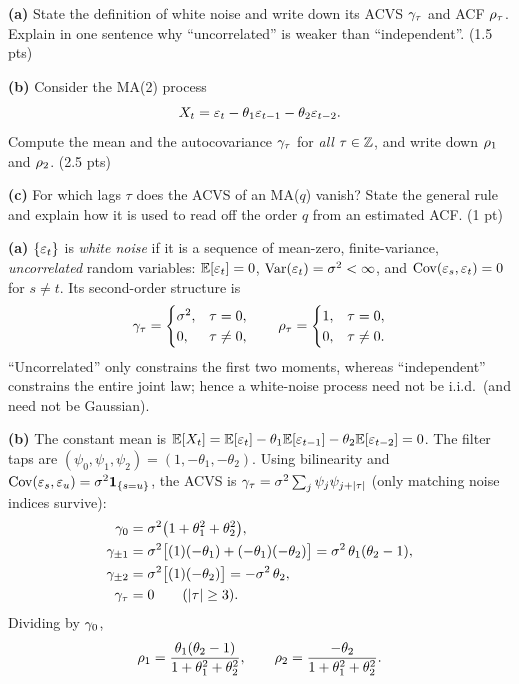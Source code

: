 \documentclass[11pt]{article}
\begin{document}

\statementstart
\textbf{(a)} State the definition of white noise and write down its ACVS $\gamma_\tau$ and ACF $\rho_\tau$. Explain in one sentence why ``uncorrelated'' is weaker than ``independent''. \hfill(1.5 pts)

\textbf{(b)} Consider the MA(2) process
\[
X_t=\varepsilon_t-\theta_1\varepsilon_{t-1}-\theta_2\varepsilon_{t-2}.
\]
Compute the mean and the autocovariance $\gamma_\tau$ for \emph{all} $\tau\in\mathbb{Z}$, and write down $\rho_1$ and $\rho_2$. \hfill(2.5 pts)

\textbf{(c)} For which lags $\tau$ does the ACVS of an MA($q$) vanish? State the general rule and explain how it is used to read off the order $q$ from an estimated ACF. \hfill(1 pt)
\statementend

\textbf{(a)} $\{\varepsilon_t\}$ is \emph{white noise} if it is a sequence of mean-zero, finite-variance, \emph{uncorrelated} random variables: $\mathbb{E}[\varepsilon_t]=0$, $\operatorname{Var}(\varepsilon_t)=\sigma^2<\infty$, and $\operatorname{Cov}(\varepsilon_s,\varepsilon_t)=0$ for $s\ne t$. Its second-order structure is
\[
\gamma_\tau=\begin{cases}\sigma^2,&\tau=0,\\ 0,&\tau\ne0,\end{cases}
\qquad
\rho_\tau=\begin{cases}1,&\tau=0,\\ 0,&\tau\ne0.\end{cases}
\]
``Uncorrelated'' only constrains the first two moments, whereas ``independent'' constrains the entire joint law; hence a white-noise process need not be i.i.d.\ (and need not be Gaussian).

\textbf{(b)} The constant mean is $\mathbb{E}[X_t]=\mathbb{E}[\varepsilon_t]-\theta_1\mathbb{E}[\varepsilon_{t-1}]-\theta_2\mathbb{E}[\varepsilon_{t-2}]=0$. The filter taps are $(\psi_0,\psi_1,\psi_2)=(1,-\theta_1,-\theta_2)$. Using bilinearity and $\operatorname{Cov}(\varepsilon_s,\varepsilon_u)=\sigma^2\mathbf{1}_{\{s=u\}}$, the ACVS is $\gamma_\tau=\sigma^2\sum_j\psi_j\psi_{j+\left\lvert \tau \right\rvert}$ (only matching noise indices survive):
\[
\begin{aligned}
\gamma_0&=\sigma^2\big(1+\theta_1^2+\theta_2^2\big),\\
\gamma_{\pm1}&=\sigma^2\big[(1)(-\theta_1)+(-\theta_1)(-\theta_2)\big]=\sigma^2\,\theta_1(\theta_2-1),\\
\gamma_{\pm2}&=\sigma^2\big[(1)(-\theta_2)\big]=-\sigma^2\,\theta_2,\\
\gamma_\tau&=0\qquad(\left\lvert \tau \right\rvert\ge3).
\end{aligned}
\]
Dividing by $\gamma_0$,
\[
\rho_1=\frac{\theta_1(\theta_2-1)}{1+\theta_1^2+\theta_2^2},
\qquad
\rho_2=\frac{-\theta_2}{1+\theta_1^2+\theta_2^2}.
\]
\end{document}
